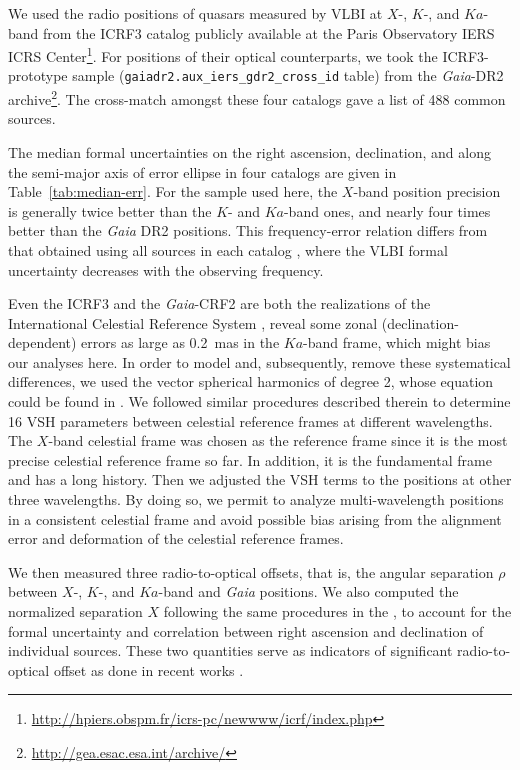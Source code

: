 \documentclass{aa}
\begin{document}
   We used the radio positions of quasars measured by VLBI at $X$-, $K$-, and $Ka$-band from the ICRF3 catalog publicly available at the Paris Observatory IERS ICRS Center\footnote{\url{http://hpiers.obspm.fr/icrs-pc/newwww/icrf/index.php}}.
   For positions of their optical counterparts, we took the ICRF3-prototype sample (\texttt{gaiadr2.aux\_iers\_gdr2\_cross\_id} table) from the \textit{Gaia}-DR2 archive\footnote{\url{http://gea.esac.esa.int/archive/}}.
   The cross-match amongst these four catalogs gave a list of 488 common sources.

   The median formal uncertainties on the right ascension, declination, and along the semi-major axis of error ellipse in four catalogs are given in Table~\ref{tab:median-err}.
   For the sample used here, the $X$-band position precision is generally twice better than the $K$- and $Ka$-band ones, and nearly four times better than the \textit{Gaia} DR2 positions.
   This frequency-error relation differs from that obtained using all sources in each catalog \citep{2020A&A...634A..28L},
   where the VLBI formal uncertainty decreases with the observing frequency.

   Even the ICRF3 and the \textit{Gaia}-CRF2 are both the realizations of the International Celestial Reference System \citep[ICRS;][]{1995A&A...303..604A,1998A&A...331L..33F}, \citet{2020A&A...634A..28L} reveal some zonal (declination-dependent) errors as large as 0.2~mas in the $Ka$-band frame, which might bias our analyses here.
   In order to model and, subsequently, remove these systematical differences, we used the vector spherical harmonics \citep[VSH;][]{2012A&A...547A..59M} of degree 2, whose equation could be found in \citet[][their Eq.~(1)]{2020A&A...634A..28L}.
   We followed similar procedures described therein to determine 16 VSH parameters between celestial reference frames at different wavelengths.
   The $X$-band celestial frame was chosen as the reference frame since it is the most precise celestial reference frame so far.
   In addition, it is the fundamental frame and has a long history.
   Then we adjusted the VSH terms to the positions at other three wavelengths.
   By doing so, we permit to analyze multi-wavelength positions in a consistent celestial frame and avoid possible bias arising from the alignment error and deformation of the celestial reference frames.

   We then measured three radio-to-optical offsets, that is, the angular separation $\rho$ between $X$-, $K$-, and $Ka$-band and \textit{Gaia} positions.
   We also computed the normalized separation $X$ following the same procedures in the \citet[][their X-statistics]{2016A&A...595A...5M},
   to account for the formal uncertainty and correlation between right ascension and declination of individual sources.
   These two quantities serve as indicators of significant radio-to-optical offset as done in recent works \citep[e.g.,][]{2019MNRAS.482.3023P,2018A&A...616A..14G}.
\end{document}
